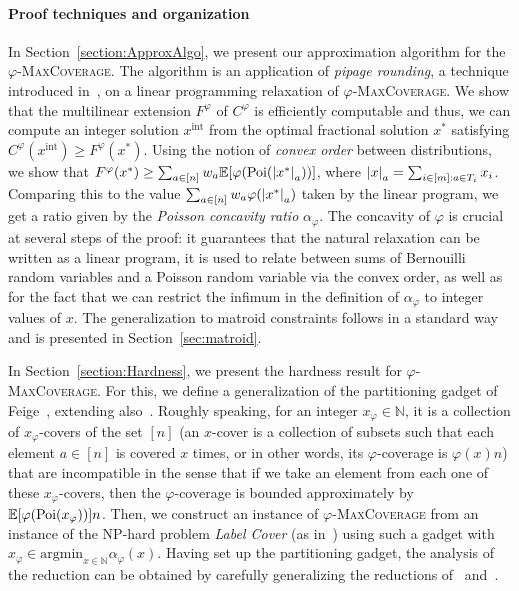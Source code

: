 \paragraph{Proof techniques and organization}
In Section~\ref{section:ApproxAlgo}, we present our approximation algorithm for the $\varphi$-\textsc{MaxCoverage}. The algorithm is an application of \emph{pipage rounding}, a technique introduced in~\cite{AS04}, on a linear programming relaxation of $\varphi$-\textsc{MaxCoverage}. We show that the multilinear extension $F^{\varphi}$ of $C^{\varphi}$ is efficiently computable and thus, we can compute an integer solution $x^{\text{int}}$ from the optimal fractional solution $x^*$ satisfying $C^{\varphi}(x^{\text{int}}) \geq F^{\varphi}(x^*)$. Using the notion of \emph{convex order} between distributions, we show that $F^{\varphi}(x^*) \geq \sum_{a \in [n]} w_a \mathbb{E}[\varphi(\operatorname{\text{Poi}}(\abs{x^*}_a))]$, where $\abs{x}_{a} = \sum_{i \in [m] : a \in T_i} x_i$. Comparing this to the value $\sum_{a \in [n]} w_a \varphi(\abs{x^*}_a)$ taken by the linear program, we get a ratio given by the \emph{Poisson concavity ratio} $\alpha_{\varphi}$. The concavity of $\varphi$ is crucial at several steps of the proof: it guarantees that the natural relaxation can be written as a linear program, it is used to relate between sums of Bernouilli random variables and a Poisson random variable via the convex order, as well as for the fact that we can restrict the infimum in the definition of $\alpha_{\varphi}$ to integer values of $x$. The generalization to matroid constraints follows in a standard way and is presented in Section~\ref{sec:matroid}.

In Section~\ref{section:Hardness}, we present the hardness result for $\varphi$-\textsc{MaxCoverage}. For this, we define a generalization of the partitioning gadget of Feige~\cite{Feige98}, extending also~\cite{BFGG20}. Roughly speaking, for an integer $x_{\varphi} \in \mathbb{N}$, it is a collection of $x_{\varphi}$-covers  of the set $[n]$ (an $x$-cover is a collection of subsets such that each element $a \in [n]$ is covered $x$ times, or in other words, its $\varphi$-coverage is $\varphi(x)n$) that are incompatible in the sense that if we take an element from each one of these $x_{\varphi}$-covers, then the $\varphi$-coverage is bounded approximately by $\mathbb{E}[\varphi(\operatorname{\text{Poi}}(x_{\varphi}))] n$. Then, we construct an instance of $\varphi$-\textsc{MaxCoverage} from an instance of the \textrm{NP}-hard problem \emph{Label Cover} (as in~\cite{DMMS20}) using such a gadget with $x_{\varphi} \in \text{argmin}_{x \in \mathbb{N}} \alpha_{\varphi}(x)$. Having set up the partitioning gadget, the analysis of the reduction can be obtained by carefully generalizing the reductions of~\cite{BFGG20} and~\cite{DMMS20}.

